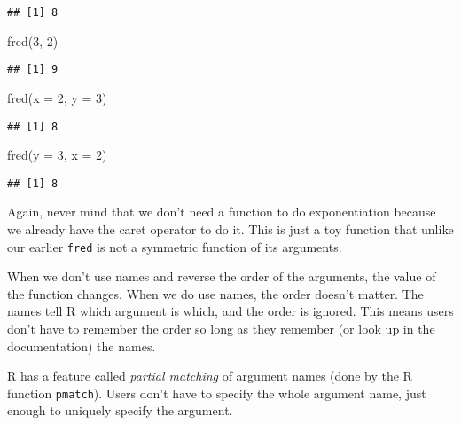 \documentclass[
]{article}
\newenvironment{Shaded}{\begin{snugshade}}{\end{snugshade}}
\newcommand{\AttributeTok}[1]{\textcolor[rgb]{0.77,0.63,0.00}{#1}}
\newcommand{\DecValTok}[1]{\textcolor[rgb]{0.00,0.00,0.81}{#1}}
\newcommand{\FunctionTok}[1]{\textcolor[rgb]{0.00,0.00,0.00}{#1}}
\newcommand{\NormalTok}[1]{#1}
\begin{document}
\begin{verbatim}
## [1] 8
\end{verbatim}

\begin{Shaded}
\begin{Highlighting}[]
\FunctionTok{fred}\NormalTok{(}\DecValTok{3}\NormalTok{, }\DecValTok{2}\NormalTok{)}
\end{Highlighting}
\end{Shaded}

\begin{verbatim}
## [1] 9
\end{verbatim}

\begin{Shaded}
\begin{Highlighting}[]
\FunctionTok{fred}\NormalTok{(}\AttributeTok{x =} \DecValTok{2}\NormalTok{, }\AttributeTok{y =} \DecValTok{3}\NormalTok{)}
\end{Highlighting}
\end{Shaded}

\begin{verbatim}
## [1] 8
\end{verbatim}

\begin{Shaded}
\begin{Highlighting}[]
\FunctionTok{fred}\NormalTok{(}\AttributeTok{y =} \DecValTok{3}\NormalTok{, }\AttributeTok{x =} \DecValTok{2}\NormalTok{)}
\end{Highlighting}
\end{Shaded}

\begin{verbatim}
## [1] 8
\end{verbatim}

Again, never mind that we don't need a function to do exponentiation
because we already have the caret operator to do it. This is just a toy
function that unlike our earlier \texttt{fred} is not a symmetric
function of its arguments.

When we don't use names and reverse the order of the arguments, the
value of the function changes. When we do use names, the order doesn't
matter. The names tell R which argument is which, and the order is
ignored. This means users don't have to remember the order so long as
they remember (or look up in the documentation) the names.

R has a feature called \emph{partial matching} of argument names (done
by the R function \texttt{pmatch}). Users don't have to specify the
whole argument name, just enough to uniquely specify the argument.
\end{document}
